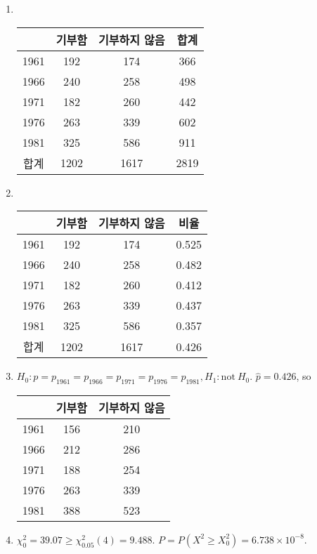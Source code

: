 \documentclass{article}
\begin{document}
\begin{enumerate}
	\item ~
		\begin{center}
		\begin{tabular}{c|cc|c}
			& 기부함 & 기부하지 않음 & 합계 \\
			\hline
			1961 & 192 & 174 & 366 \\
			1966 & 240 & 258 & 498 \\
			1971 & 182 & 260 & 442 \\
			1976 & 263 & 339 & 602 \\
			1981 & 325 & 586 & 911 \\
			\hline
			합계 & 1202 & 1617 & 2819
		\end{tabular}
		\end{center}
	\item ~
		\begin{center}
		\begin{tabular}{c|cc|c}
			& 기부함 & 기부하지 않음 & 비율 \\
			\hline
			1961 & 192 & 174 & 0.525 \\
			1966 & 240 & 258 & 0.482 \\
			1971 & 182 & 260 & 0.412 \\
			1976 & 263 & 339 & 0.437 \\
			1981 & 325 & 586 & 0.357 \\
			\hline
			합계 & 1202 & 1617 & 0.426
		\end{tabular}
		\end{center}
	\item $H_0: p = p_{1961} = p_{1966} = p_{1971} = p_{1976} = p_{1981}, H_1: \textrm{not}~ H_0$.
		$\widehat{p} = 0.426$, so
		\begin{center}
		\begin{tabular}{c|cc}
			& 기부함 & 기부하지 않음 \\
			\hline
			1961 & 156 & 210 \\
			1966 & 212 & 286 \\
			1971 & 188 & 254 \\
			1976 & 263 & 339 \\
			1981 & 388 & 523 \\
		\end{tabular}
		\end{center}
	\item $\chi_0^2 = 39.07 \ge \chi_{0.05}^2(4) = 9.488$. $P = P(X^2 \ge X_0^2) = 6.738\times 10^{-8}$.
\end{enumerate}
\end{document}
